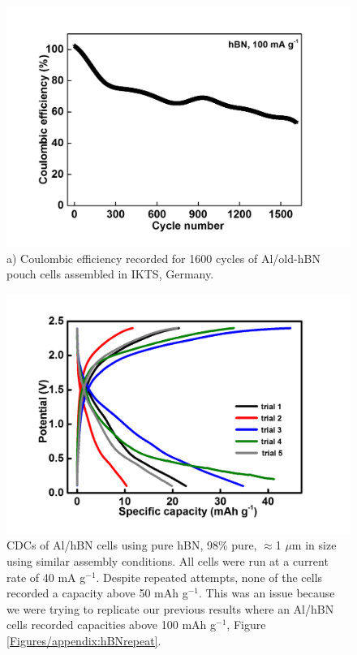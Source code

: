 \begin{figure}[tbh!]
\centering
\includegraphics[width=\textwidth]{Figures/appendix/pouchCE}
\caption{a) Coulombic efficiency recorded for 1600 cycles of Al/old-hBN pouch cells assembled in IKTS, Germany.}
\label{Figures/appendix:pouchCE}
\end{figure}

\begin{figure}[tbh!]
\centering
\includegraphics[width=\textwidth]{Figures/appendix/hBNmultiattempts}
\caption{CDCs of Al/hBN cells using pure hBN, 98\% pure, $\approx$1 $\mu$m in size using similar assembly conditions. All cells were run at a current rate of 40 mA g$^{-1}$. Despite repeated attempts, none of the cells recorded a capacity above 50 mAh g$^{-1}$. This was an issue because we were trying to replicate our previous results where an Al/hBN cells recorded capacities above 100 mAh g$^{-1}$, Figure \ref{Figures/appendix:hBNrepeat}.}
\label{Figures/appendix:hBNmultiattempts}
\end{figure}

